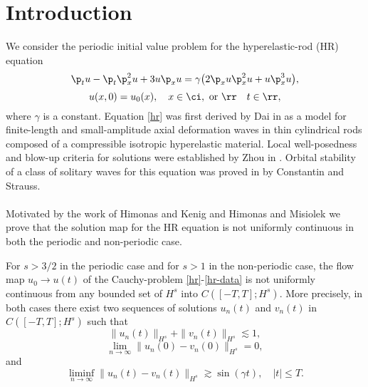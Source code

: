 \section{Introduction}
%
We consider the periodic initial value problem for
the hyperelastic-rod (HR)  equation
\begin{equation}
	\label{hr}
	\p_t u
	-
	\p_t \p_x^2 u
	+
	3u\p_x u
	=
	\gamma \big (
	2\p_x u \p_x^2 u
	+
	u \p_x^3 u
	\big ),
\end{equation}
\begin{equation}
	\label{hr-data} u(x, 0) = u_0 (x),
	\quad x  \in \ci, \text{  or  } \rr \quad t \in \rr,
\end{equation}
where $\gamma$ is a constant. Equation \ref{hr} was first
derived by Dai in \cite{Dai_1998_Model-equations} as a model for finite-length and
small-amplitude axial deformation waves in thin cylindrical
rods composed of a compressible isotropic hyperelastic
material. Local well-posedness and blow-up criteria for
solutions were established by  Zhou in \cite{Liu_2008_Blow-up-phenome}. Orbital
stability of a class of solitary waves for this equation was
proved in \cite{Constantin_2000_Stability-of-a-} by Constantin and Strauss.
\\
\\
Motivated by the work of Himonas and Kenig \cite{Himonas:2009fk} and
Himonas and Misiolek \cite{Himonas:2005kx} we prove that 
the solution map for the HR equation is not uniformly
continuous in both the periodic and non-periodic case.
%
\begin{theorem}
	\label{hr-non-unif-dependence}
	For $s>3/2$ in the periodic case and for $s>1$ in
	the non-periodic case, the flow map $u_0 \to u(t)$ of the
	Cauchy-problem \eqref{hr}-\eqref{hr-data} is not uniformly continuous
	from any bounded set of $H^s$ into $C([-T, T]; H^s)$.
	More precisely, in both cases there exist two sequences of solutions $u_n(t)$
	and $v_n(t)$ in $C([-T, T]; H^s)$ such that
	\begin{equation}
		\label{h-s-bdd}
		\| u_n(t)  \|_{H^s}
		+
		\| v_n(t)  \|_{H^s}
		\lesssim
		1,
	\end{equation}
	\begin{equation}
		\label{zero-limit-at-0}
		\lim_{n\to\infty}
		\|
		u_n(0)
		-
		v_n(0)
		\|_{H^s}
		=
		0,
	\end{equation}
	and
	\begin{equation}
		\label{bdd-away-from-0}
		\liminf_{n\to\infty}
		\|
		u_n(t)
		-
		v_n(t)
	\|_{H^s}
		\gtrsim
		\sin ( \gamma t),
		\quad
		|t|\le T.
	\end{equation}
	\end{theorem}
